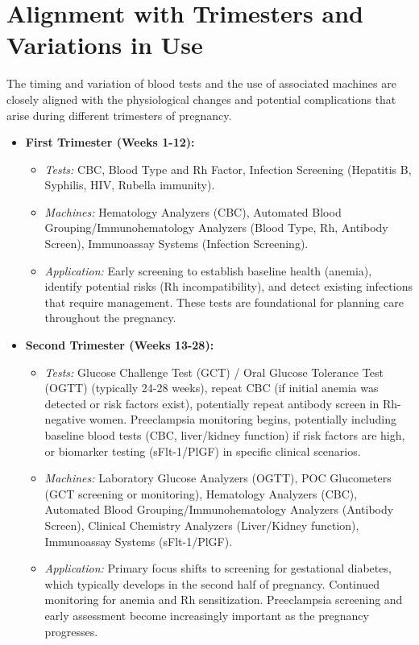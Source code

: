 \documentclass{article}
\begin{document}
\section{Alignment with Trimesters and Variations in Use}

The timing and variation of blood tests and the use of associated machines are closely aligned with the physiological changes and potential complications that arise during different trimesters of pregnancy.

\begin{itemize}
    \item \textbf{First Trimester (Weeks 1-12):}
    \begin{itemize}
        \item \textit{Tests:} CBC, Blood Type and Rh Factor, Infection Screening (Hepatitis B, Syphilis, HIV, Rubella immunity).
        \item \textit{Machines:} Hematology Analyzers (CBC), Automated Blood Grouping/Immunohematology Analyzers (Blood Type, Rh, Antibody Screen), Immunoassay Systems (Infection Screening).
        \item \textit{Application:} Early screening to establish baseline health (anemia), identify potential risks (Rh incompatibility), and detect existing infections that require management. These tests are foundational for planning care throughout the pregnancy.
    \end{itemize}
    \item \textbf{Second Trimester (Weeks 13-28):}
    \begin{itemize}
        \item \textit{Tests:} Glucose Challenge Test (GCT) / Oral Glucose Tolerance Test (OGTT) (typically 24-28 weeks), repeat CBC (if initial anemia was detected or risk factors exist), potentially repeat antibody screen in Rh-negative women. Preeclampsia monitoring begins, potentially including baseline blood tests (CBC, liver/kidney function) if risk factors are high, or biomarker testing (sFlt-1/PlGF) in specific clinical scenarios.
        \item \textit{Machines:} Laboratory Glucose Analyzers (OGTT), POC Glucometers (GCT screening or monitoring), Hematology Analyzers (CBC), Automated Blood Grouping/Immunohematology Analyzers (Antibody Screen), Clinical Chemistry Analyzers (Liver/Kidney function), Immunoassay Systems (sFlt-1/PlGF).
        \item \textit{Application:} Primary focus shifts to screening for gestational diabetes, which typically develops in the second half of pregnancy. Continued monitoring for anemia and Rh sensitization. Preeclampsia screening and early assessment become increasingly important as the pregnancy progresses.

\end{itemize}
\end{itemize}
\end{document}
